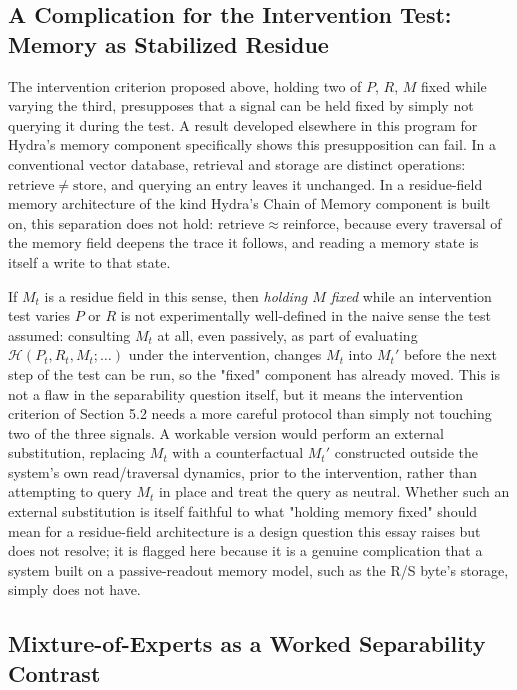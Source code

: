 \documentclass[11pt]{article}
\begin{document}
\subsection{A Complication for the Intervention Test: Memory as Stabilized Residue}

The intervention criterion proposed above, holding two of $P$, $R$, $M$ fixed while varying the third, presupposes that a signal can be held fixed by simply not querying it during the test. A result developed elsewhere in this program for Hydra's memory component specifically shows this presupposition can fail. In a conventional vector database, retrieval and storage are distinct operations: $\mathrm{retrieve} \neq \mathrm{store}$, and querying an entry leaves it unchanged. In a residue-field memory architecture of the kind Hydra's Chain of Memory component is built on, this separation does not hold: $\mathrm{retrieve} \approx \mathrm{reinforce}$, because every traversal of the memory field deepens the trace it follows, and reading a memory state is itself a write to that state.

If $M_t$ is a residue field in this sense, then \emph{holding $M$ fixed} while an intervention test varies $P$ or $R$ is not experimentally well-defined in the naive sense the test assumed: consulting $M_t$ at all, even passively, as part of evaluating $\mathcal{H}(P_t, R_t, M_t; \ldots)$ under the intervention, changes $M_t$ into $M_t'$ before the next step of the test can be run, so the "fixed" component has already moved. This is not a flaw in the separability question itself, but it means the intervention criterion of Section 5.2 needs a more careful protocol than simply not touching two of the three signals. A workable version would perform an external substitution, replacing $M_t$ with a counterfactual $M_t'$ constructed outside the system's own read/traversal dynamics, prior to the intervention, rather than attempting to query $M_t$ in place and treat the query as neutral. Whether such an external substitution is itself faithful to what "holding memory fixed" should mean for a residue-field architecture is a design question this essay raises but does not resolve; it is flagged here because it is a genuine complication that a system built on a passive-readout memory model, such as the R/S byte's storage, simply does not have.

\subsection{Mixture-of-Experts as a Worked Separability Contrast}
\end{document}
